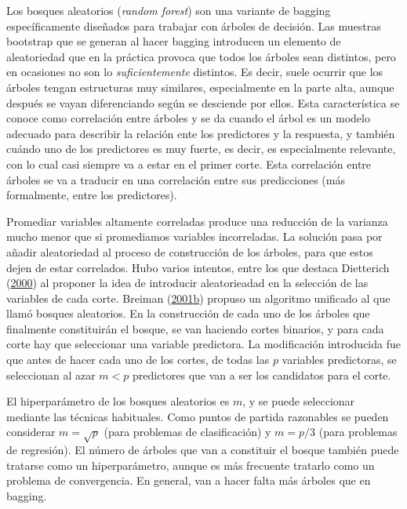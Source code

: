 \documentclass[
  spanish,
]{book}
\theoremstyle{break}
\theoremstyle{definition}
\theoremstyle{definition}
\theoremstyle{definition}
\theoremstyle{remark}
\begin{document}
Los bosques aleatorios (\emph{random forest}) son una variante de bagging específicamente diseñados para trabajar con árboles de decisión.
Las muestras bootstrap que se generan al hacer bagging introducen un elemento de aleatoriedad que en la práctica provoca que todos los árboles sean distintos, pero en ocasiones no son lo \emph{suficientemente} distintos.
Es decir, suele ocurrir que los árboles tengan estructuras muy similares, especialmente en la parte alta, aunque después se vayan diferenciando según se desciende por ellos.
Esta característica se conoce como correlación entre árboles y se da cuando el árbol es un modelo adecuado para describir la relación ente los predictores y la respuesta, y también cuándo uno de los predictores es muy fuerte, es decir, es especialmente relevante, con lo cual casi siempre va a estar en el primer corte.
Esta correlación entre árboles se va a traducir en una correlación entre sus predicciones (más formalmente, entre los predictores).

Promediar variables altamente correladas produce una reducción de la varianza mucho menor que si promediamos variables incorreladas.
La solución pasa por añadir aleatoriedad al proceso de construcción de los árboles, para que estos dejen de estar correlados.
Hubo varios intentos, entre los que destaca Dietterich (\protect\hyperlink{ref-dietterich2000experimental}{2000}) al proponer la idea de introducir aleatorieadad en la selección de las variables de cada corte.
Breiman (\protect\hyperlink{ref-breiman2001statistical}{2001}\protect\hyperlink{ref-breiman2001statistical}{b}) propuso un algoritmo unificado al que llamó bosques aleatorios.
En la construcción de cada uno de los árboles que finalmente constituirán el bosque, se van haciendo cortes binarios, y para cada corte hay que seleccionar una variable predictora.
La modificación introducida fue que antes de hacer cada uno de los cortes, de todas las \(p\) variables predictoras, se seleccionan al azar \(m < p\) predictores que van a ser los candidatos para el corte.

El hiperparámetro de los bosques aleatorios es \(m\), y se puede seleccionar mediante las técnicas habituales.
Como puntos de partida razonables se pueden considerar \(m = \sqrt{p}\) (para problemas de clasificación) y \(m = p/3\) (para problemas de regresión).
El número de árboles que van a constituir el bosque también puede tratarse como un hiperparámetro, aunque es más frecuente tratarlo como un problema de convergencia.
En general, van a hacer falta más árboles que en bagging.
\end{document}

